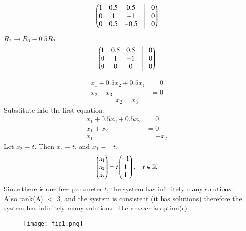 \documentclass[journal]{IEEEtran}
\begin{document}
   \begin{align}
    \myvec{
    1 & 0.5 & 0.5 & \vrule & 0 \\
    0 & 1 & -1 & \vrule & 0 \\
    0 & 0.5 & -0.5 & \vrule & 0
    }
    \end{align}

    $R_3 \rightarrow R_3 - 0.5 R_2$
    \begin{align}
    \myvec{
    1 & 0.5 & 0.5 & \vrule & 0 \\
    0 & 1 & -1 & \vrule & 0 \\
    0 & 0 & 0 & \vrule & 0
    }
    \end{align}

    \begin{align}
    x_1 + 0.5x_2 + 0.5x_3 &= 0 \\
    x_2 - x_3 &= 0
    \end{align}
    \begin{align}
    x_2 = x_3
    \end{align}
    Substitute into the first equation:
    \begin{align}
    x_1 + 0.5x_2 + 0.5x_2 &= 0 \\
    x_1 + x_2 &= 0 \\
    x_1 &= -x_2
    \end{align}
    Let $x_2 = t$. Then $x_3 = t$, and $x_1 = -t$.
    \begin{align}
    \begin{pmatrix}x_1 \\ x_2 \\ x_3\end{pmatrix} = t \begin{pmatrix}-1 \\ 1 \\ 1\end{pmatrix}, \quad t \in \mathbb{R}
    \end{align}
Since there is one free parameter $t$, the system has infinitely many solutions.\\
Also rank(A) $<$ 3, and the system is consistent (it has solutions) therefore the system has infinitely many solutions.
The answer is option(c).

\begin{figure}[H]
\centering
\texttt{[image: fig1.png]}
\caption{}
\label{fig:1}
\end{figure}
\end{document}
